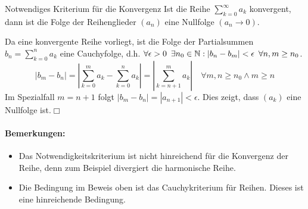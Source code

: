 \begin{satz}{Notwendiges Kriterium für die Konvergenz}
	Ist die Reihe $\sum_{k=0}^\infty a_k$ konvergent, dann ist die Folge der Reihenglieder $(a_n)$ eine Nullfolge $(a_n\rightarrow0)$.
\end{satz}
\beweis
Da eine konvergente Reihe vorliegt, ist die Folge der Partialsummen $b_n=\sum_{k=0}^n a_k$ eine Cauchyfolge, d.h. $\forall \epsilon>0\enspace\exists n_0\in\mathbb{N}:|b_n-b_m|<\epsilon\enspace\forall n,m\geq n_0$.
\begin{equation*}
	|b_m-b_n|=\left|\sum_{k=0}^m a_k-\sum_{k=0}^n a_k\right|=\left|\sum_{k=n+1}^m a_k\right| \quad\forall m,n\geq n_0\wedge m\geq n
\end{equation*}
Im Spezialfall $m=n+1$ folgt $|b_m-b_n|=|a_{n+1}|<\epsilon$. Dies zeigt, dass $(a_k)$ eine Nullfolge ist.\hfill$\Box$
\paragraph{Bemerkungen:}
\begin{itemize}
	\item Das Notwendigkeitskriterium ist nicht hinreichend für die Konvergenz der Reihe, denn zum Beispiel divergiert die harmonische Reihe.
	\item Die Bedingung im Beweis oben ist das Cauchykriterium für Reihen. Dieses ist eine hinreichende Bedingung.
\end{itemize}
